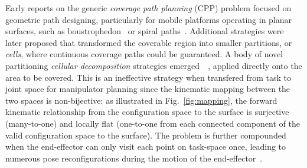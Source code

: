 \documentclass[conference]{IEEEtran}
\begin{document}



Early reports on the generic \textit{coverage path planning} (CPP) problem focused on geometric path designing, particularly for mobile platforms operating in planar surfaces, such as boustrophedon~\cite{choset1998coverage} or spiral paths~\cite{hassan2018a}. 
Additional strategies were later proposed that transformed the coverable region into smaller partitions, or \textit{cells}, where continuous coverage paths could be guaranteed. A body of novel partitioning \textit{cellular decomposition} strategies emerged~\cite{choset2000exact}~\cite{huang2001optimal}, applied directly onto the area to be covered. This is an ineffective strategy when transfered from task to joint space for manipulator planning since the kinematic mapping between the two spaces is non-bijective: as illustrated in Fig.~\ref{fig:mapping}, the forward kinematic relationship from the configuration space to the surface is surjective (many-to-one) and locally flat (one-to-one from each connected component of the valid configuration space to the surface). 
The problem is further compounded when the end-effector can only visit each point on task-space once, leading to numerous pose reconfigurations during the motion of the end-effector~\cite{rososhansky2011coverage}.
\end{document}
